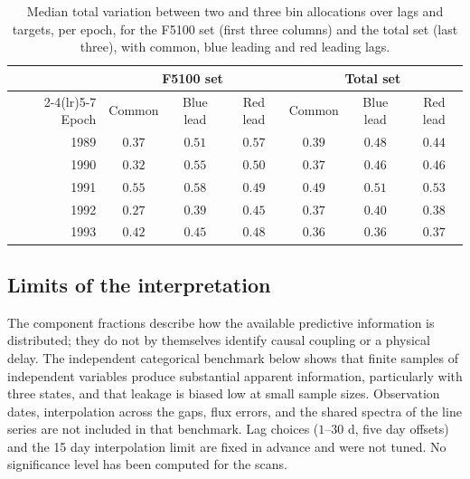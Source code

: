 \documentclass[fleqn,usenatbib]{mnras}
\newenvironment{SURDtable}{\begin{table}}{\end{table}}
\begin{document}
\begin{SURDtable}
\centering
\caption{Median total variation between two and three bin allocations over lags and
targets, per epoch, for the F5100 set (first three columns) and the total set
(last three), with common, blue leading and red leading lags.}
\label{tab:ep_bins}
\small
\begin{tabular}{rcccccc}
\toprule
 & \multicolumn{3}{c}{F5100 set} & \multicolumn{3}{c}{Total set} \\
\cmidrule(lr){2-4}\cmidrule(lr){5-7}
Epoch & Common & Blue lead & Red lead & Common & Blue lead & Red lead \\
\midrule
1989 & $0.37$ & $0.51$ & $0.57$ & $0.39$ & $0.48$ & $0.44$ \\
1990 & $0.32$ & $0.55$ & $0.50$ & $0.37$ & $0.46$ & $0.46$ \\
1991 & $0.55$ & $0.58$ & $0.49$ & $0.49$ & $0.51$ & $0.53$ \\
1992 & $0.27$ & $0.39$ & $0.45$ & $0.37$ & $0.40$ & $0.38$ \\
1993 & $0.42$ & $0.45$ & $0.48$ & $0.36$ & $0.36$ & $0.37$ \\
\bottomrule
\end{tabular}

\end{SURDtable}

\subsection{Limits of the interpretation}

The component fractions describe how the available predictive information is
distributed; they do not by themselves identify causal coupling or a physical delay.
The independent categorical benchmark below shows that finite samples of
independent variables produce substantial apparent information, particularly with
three states, and that leakage is biased low at small sample sizes. Observation
dates, interpolation across the gaps, flux errors, and the shared spectra of the
line series are not included in that benchmark. Lag choices ($1$--$30$ d, five day
offsets) and the 15 day interpolation limit are fixed in advance and were not
tuned. No significance level has been computed for the scans.
\end{document}
